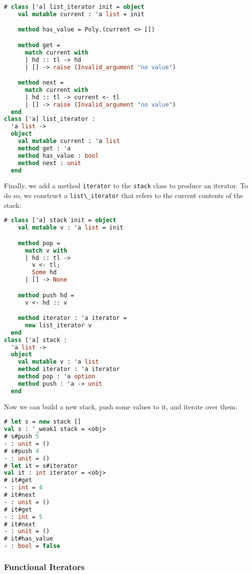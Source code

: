 \begin{lstlisting}[language=Caml]
# class ['a] list_iterator init = object
    val mutable current : 'a list = init

    method has_value = Poly.(current <> [])

    method get =
      match current with
      | hd :: tl -> hd
      | [] -> raise (Invalid_argument "no value")

    method next =
      match current with
      | hd :: tl -> current <- tl
      | [] -> raise (Invalid_argument "no value")
  end
class ['a] list_iterator :
  'a list ->
  object
    val mutable current : 'a list
    method get : 'a
    method has_value : bool
    method next : unit
  end
\end{lstlisting}

Finally, we add a method \passthrough{\lstinline!iterator!} to the
\passthrough{\lstinline!stack!} class to produce an iterator. To do so,
we construct a \passthrough{\lstinline!list\_iterator!} that refers to
the current contents of the stack:

\begin{lstlisting}[language=Caml]
# class ['a] stack init = object
    val mutable v : 'a list = init

    method pop =
      match v with
      | hd :: tl ->
        v <- tl;
        Some hd
      | [] -> None

    method push hd =
      v <- hd :: v

    method iterator : 'a iterator =
      new list_iterator v
  end
class ['a] stack :
  'a list ->
  object
    val mutable v : 'a list
    method iterator : 'a iterator
    method pop : 'a option
    method push : 'a -> unit
  end
\end{lstlisting}

Now we can build a new stack, push some values to it, and iterate over
them:

\begin{lstlisting}[language=Caml]
# let s = new stack []
val s : '_weak1 stack = <obj>
# s#push 5
- : unit = ()
# s#push 4
- : unit = ()
# let it = s#iterator
val it : int iterator = <obj>
# it#get
- : int = 4
# it#next
- : unit = ()
# it#get
- : int = 5
# it#next
- : unit = ()
# it#has_value
- : bool = false
\end{lstlisting}

\hypertarget{functional-iterators}{%
\subsubsection{Functional Iterators}\label{functional-iterators}}

